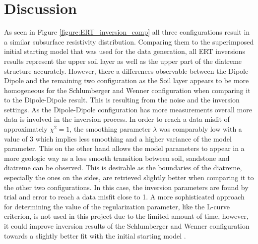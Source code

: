 \section{Discussion}\label{section:Discussion}

As seen in Figure \ref{figure:ERT_inversion_comp} all three configurations result in a similar subsurface resistivity distribution. Comparing them to the superimposed initial starting model that was used for the data generation, all ERT inversions results represent the upper soil layer as well as the upper part of the diatreme structure accurately. However, there a differences observable between the Dipole-Dipole and the remaining two configuration as the Soil layer appears to be more homogeneous for the Schlumberger and Wenner configuration when comparing it to the Dipole-Dipole result. This is resulting from the noise and the inversion settings. As the Dipole-Dipole configuration has more measurements overall more data is involved in the inversion process. In order to reach a data misfit of approximately $\chi^2=1$, the smoothing parameter $\lambda$ was comparably low with a value of 3 which implies less smoothing and a higher variance of the model parameter. This on the other hand allows the model parameters to appear in a more geologic way as a less smooth transition between soil, sandstone and diatreme can be observed. This is desirable as the boundaries of the diatreme, especially the ones on the sides, are retrieved slightly better when comparing it to the other two configurations. In this case, the inversion parameters are found by trial and error to reach a data misfit close to 1. A more sophisticated approach for determining the value of the regularization parameter, like the L-curve criterion, is not used in this project due to the limited amount of time, however, it could improve inversion results of the Schlumberger and Wenner configuration towards a slightly better fit with the initial starting model \citep{lawson1995solving}.

